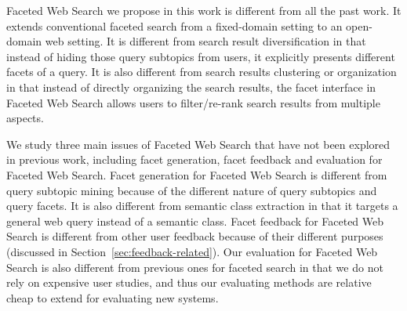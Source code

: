 Faceted Web Search we propose in this work is different from all the past work. It extends conventional faceted search from a fixed-domain setting to an open-domain web setting. It is different from search result diversification in that instead of hiding those query subtopics from users, it explicitly presents different facets of a query. It is also different from search results clustering or organization in that instead of directly organizing the search results, the facet interface in Faceted Web Search allows users to filter/re-rank search results from multiple aspects.

We study three main issues of Faceted Web Search that have not been explored in previous work, including facet generation, facet feedback and evaluation for Faceted Web Search. Facet generation for Faceted Web Search is different from query subtopic mining because of the different nature of query subtopics and query facets. It is also different from semantic class extraction in that it targets a general web query instead of a semantic class. Facet feedback for Faceted Web Search is different from other user feedback because of their different purposes (discussed in Section~\ref{sec:feedback-related}). 
Our evaluation for Faceted Web Search is also different from previous ones for faceted search in that we do not rely on expensive user studies, and thus our evaluating methods are relative cheap to extend for evaluating new systems.